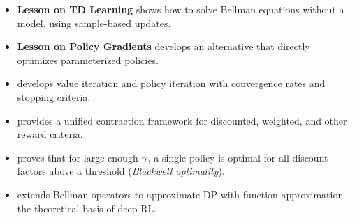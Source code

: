 \documentclass[11pt,a4paper]{article}
\begin{document}
\begin{itemize}
    \item \textbf{Lesson on TD Learning} shows how to solve Bellman
    equations without a model, using sample-based updates.
    \item \textbf{Lesson on Policy Gradients} develops an alternative
    that directly optimizes parameterized policies.
    \item \citet[Chapters 6--7]{puterman2014} develops value iteration
    and policy iteration with convergence rates and stopping criteria.
    \item \citet{denardo1967} provides a unified contraction framework
    for discounted, weighted, and other reward criteria.
    \item \citet{blackwell1962} proves that for large enough
    $\gamma$, a single policy is optimal for all discount factors
    above a threshold (\emph{Blackwell optimality}).
    \item \citet[Chapters 8--9]{bertsekas2012} extends Bellman
    operators to approximate DP with function approximation -- the
    theoretical basis of deep RL.
\end{itemize}


\end{document}
